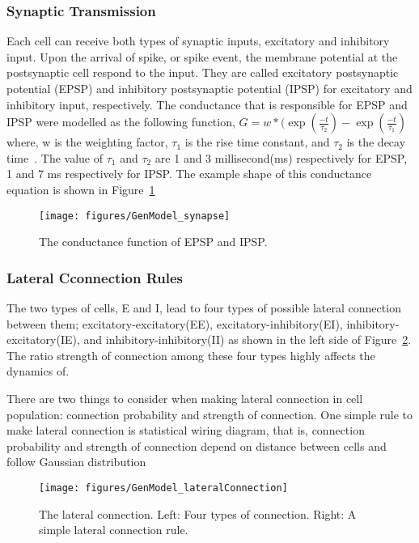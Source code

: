 \subsubsection{Synaptic Transmission}
Each cell can receive both types of synaptic inputs, excitatory and inhibitory input. Upon the arrival of spike, or spike event, the membrane potential at the postsynaptic cell respond to the input. They are called excitatory postsynaptic potential (EPSP) and inhibitory postsynaptic potential (IPSP) for excitatory and inhibitory input, respectively. 
The conductance that is responsible for EPSP and IPSP were modelled as the following function,
$G = w*(\exp(\frac{-t}{\tau_2} ) - \exp(\frac{-t}{\tau_1})$
where, w is the weighting factor, $\tau_1$ is the rise time constant, and $\tau_2$ is the decay time~\cite {carnevale2006neuron}.
The value of $\tau_1$ and $\tau_2$  are 1 and 3 millisecond(ms) respectively for EPSP, 1 and 7 ms respectively for IPSP. The example shape of this conductance equation is shown in Figure~\ref{fig:GenModel_synapse}

\begin{figure}
	\centering
	\texttt{[image: figures/GenModel\_synapse]}
	\caption{The conductance function of EPSP and IPSP.}
	\label{fig:GenModel_synapse}
\end{figure}

\subsubsection{Lateral Cconnection Rules}
The two types of cells, E and I, lead to four types of possible lateral connection between them; excitatory-excitatory(EE), excitatory-inhibitory(EI), inhibitory-excitatory(IE), and inhibitory-inhibitory(II) as shown in the left side of Figure~\ref{fig:GM_lateral}. The ratio strength of connection among these four types highly affects the dynamics of.

There are two things to consider when making lateral connection in cell population: connection probability and strength of connection. One simple rule to make lateral connection is statistical wiring diagram, that is, connection probability and  strength of connection depend on distance between cells and follow Gaussian distribution~\cite{ringach2004haphazard,mclaughlin2000neuronal}

\begin{figure}
	\centering
	\texttt{[image: figures/GenModel\_lateralConnection]}
	\caption{The lateral connection. Left: Four types of connection. Right: A simple lateral connection rule.}
	\label{fig:GM_lateral}
\end{figure}

